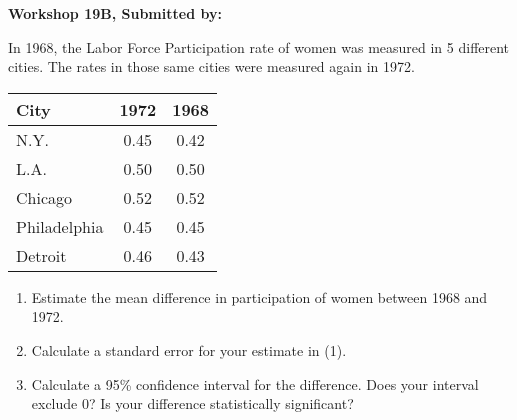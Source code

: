 \documentclass[11pt]{book}\usepackage[]{graphicx}\usepackage[]{color}
\begin{document}
\begin{exercises}
\begin{solution}
\end{solution}

\clearpage

    \begin{exercise}  %

    \begin{center}
\begin{flushleft}\textbf{\large \hfill Workshop 19B, Submitted by: }\end{flushleft}

\end{center}

In 1968, the Labor Force Participation rate of women was measured in 5 different cities.  The rates in those same cities were measured again in 1972.

\begin{center}
\begin{tabular}{@{} lcc @{}} \hline
City&	1972&	1968 \\ \hline
N.Y.&	0.45&	0.42 \\
L.A.&	0.50&	0.50 \\
Chicago&	0.52&	0.52 \\
Philadelphia&	0.45&	0.45 \\
Detroit&	0.46&	0.43 \\ \hline
\end{tabular}
\end{center}

\begin{enumerate}
  \item Estimate the mean difference in participation of women between 1968 and 1972.
  \item	Calculate a standard error for your estimate in (1).
  \item	Calculate a 95\% confidence interval for the difference.  Does your interval exclude 0?  Is your difference statistically significant?
\end{enumerate}


\end{exercise}
\end{exercises}
\end{document}
